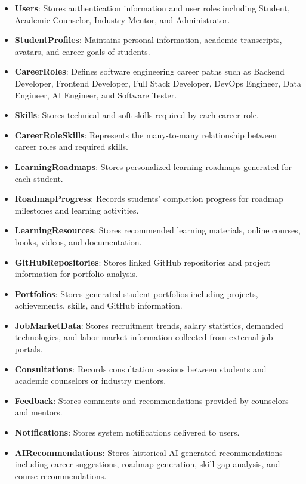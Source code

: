 \begin{itemize}
    \item \textbf{Users}: Stores authentication information and user roles including Student, Academic Counselor, Industry Mentor, and Administrator.
    
    \item \textbf{StudentProfiles}: Maintains personal information, academic transcripts, avatars, and career goals of students.
    
    \item \textbf{CareerRoles}: Defines software engineering career paths such as Backend Developer, Frontend Developer, Full Stack Developer, DevOps Engineer, Data Engineer, AI Engineer, and Software Tester.
    
    \item \textbf{Skills}: Stores technical and soft skills required by each career role.
    
    \item \textbf{CareerRoleSkills}: Represents the many-to-many relationship between career roles and required skills.
    
    \item \textbf{LearningRoadmaps}: Stores personalized learning roadmaps generated for each student.
    
    \item \textbf{RoadmapProgress}: Records students' completion progress for roadmap milestones and learning activities.
    
    \item \textbf{LearningResources}: Stores recommended learning materials, online courses, books, videos, and documentation.
    
    \item \textbf{GitHubRepositories}: Stores linked GitHub repositories and project information for portfolio analysis.
    
    \item \textbf{Portfolios}: Stores generated student portfolios including projects, achievements, skills, and GitHub information.
    
    \item \textbf{JobMarketData}: Stores recruitment trends, salary statistics, demanded technologies, and labor market information collected from external job portals.
    
    \item \textbf{Consultations}: Records consultation sessions between students and academic counselors or industry mentors.
    
    \item \textbf{Feedback}: Stores comments and recommendations provided by counselors and mentors.
    
    \item \textbf{Notifications}: Stores system notifications delivered to users.
    
    \item \textbf{AIRecommendations}: Stores historical AI-generated recommendations including career suggestions, roadmap generation, skill gap analysis, and course recommendations.
\end{itemize}

